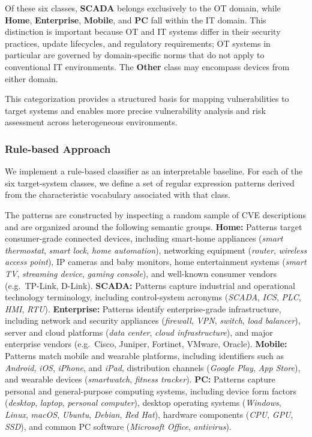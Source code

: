 \documentclass[fleqn,s1,names,tex]{neptune}
\begin{document}
Of these six classes, \textbf{SCADA} belongs exclusively to the  OT domain, while \textbf{Home}, \textbf{Enterprise}, \textbf{Mobile}, and \textbf{PC} fall within the IT domain. 
This distinction is important because OT and IT systems differ in their security practices, update lifecycles, and regulatory requirements; OT systems in particular are governed by domain-specific norms that do not apply to conventional IT environments. 
The \textbf{Other} class may encompass devices from either domain.


This categorization provides a structured basis for mapping vulnerabilities to target systems and enables more precise vulnerability analysis and risk assessment across heterogeneous environments.


\subsubsection{Rule-based Approach}

We implement a rule-based classifier as an interpretable baseline. For each of the six target-system classes, we define a set of regular expression patterns derived from the characteristic vocabulary associated with that class. 


The patterns are constructed by inspecting a random sample of CVE descriptions and are organized around the following semantic groups.
\textbf{Home:}  
Patterns target consumer-grade connected devices, including smart-home appliances (\textit{smart thermostat}, \textit{smart lock}, \textit{home automation}),  networking equipment (\textit{router}, \textit{wireless access point}), IP cameras and baby monitors, home entertainment systems (\textit{smart TV}, \textit{streaming device}, \textit{gaming console}), and well-known consumer vendors (e.g.\ TP-Link, D-Link).
\textbf{SCADA:}  
Patterns capture industrial and operational technology terminology, including control-system acronyms (\textit{SCADA}, \textit{ICS}, \textit{PLC}, \textit{HMI}, \textit{RTU}).
\textbf{Enterprise:}  
Patterns identify enterprise-grade infrastructure, including network and security appliances (\textit{firewall}, \textit{VPN}, \textit{switch}, \textit{load balancer}), server and cloud platforms (\textit{data center}, \textit{cloud infrastructure}), and major enterprise vendors (e.g.\ Cisco, Juniper, Fortinet, VMware, Oracle).
\textbf{Mobile:}  
Patterns match mobile and wearable platforms, including identifiers such as \textit{Android}, \textit{iOS}, \textit{iPhone}, and \textit{iPad}, distribution channels (\textit{Google Play}, \textit{App Store}), and wearable devices (\textit{smartwatch}, \textit{fitness tracker}).
\textbf{PC:}  
Patterns capture personal and general-purpose computing systems, including device form factors (\textit{desktop}, \textit{laptop}, \textit{personal computer}), desktop operating systems (\textit{Windows}, \textit{Linux}, \textit{macOS}, \textit{Ubuntu}, \textit{Debian}, \textit{Red Hat}), hardware components (\textit{CPU}, \textit{GPU}, \textit{SSD}), and common PC software (\textit{Microsoft Office}, \textit{antivirus}).
\end{document}
